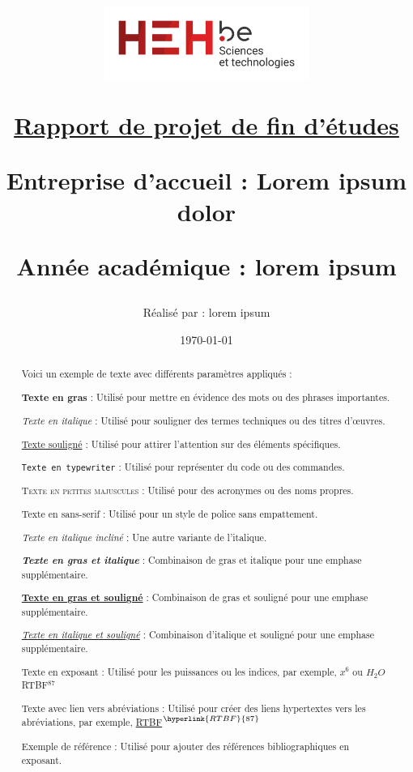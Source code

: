 \documentclass[a4paper, 12pt]{article}
\title{
    \begin{center}
        \includegraphics[width=0.5\textwidth]{img/logo_hehbe_tech.png}
    \end{center}
    \vspace{2cm}
    \begin{center}
        \underline{Rapport de projet de fin d'études}
    \end{center}
    \vspace{2cm}
    \begin{center}
        \fboxrule=0.3mm
        \fbox{
            \parbox{\textwidth}{
                \vspace{1cm}
                \centering
                \textbf{Lorem ipsum dolor sit amet, consectetur adipiscing elit. Vivamus lacinia odio vitae}
                \vspace{1cm}
            }
        }
    \end{center}
    \vspace{2cm}
    \begin{center}
        \small Entreprise d'accueil : Lorem ipsum dolor\\
    \end{center}
    \begin{center}
        \small Année académique : lorem ipsum
    \end{center}
    \author{Réalisé par : lorem ipsum}
    \date{\today}

}
\begin{document}
\maketitle
\newpage
\begin{abstract}
    Voici un exemple de texte avec différents paramètres appliqués :
    
    \textbf{Texte en gras} : Utilisé pour mettre en évidence des mots ou des phrases importantes.
    
    \textit{Texte en italique} : Utilisé pour souligner des termes techniques ou des titres d'œuvres.
    
    \underline{Texte souligné} : Utilisé pour attirer l'attention sur des éléments spécifiques.
    
    \texttt{Texte en typewriter} : Utilisé pour représenter du code ou des commandes.
    
    \textsc{Texte en petites majuscules} : Utilisé pour des acronymes ou des noms propres.
    
    \textsf{Texte en sans-serif} : Utilisé pour un style de police sans empattement.
    
    \textsl{Texte en italique incliné} : Une autre variante de l'italique.
    
    \textbf{\textit{Texte en gras et italique}} : Combinaison de gras et italique pour une emphase supplémentaire.
    
    \textbf{\underline{Texte en gras et souligné}} : Combinaison de gras et souligné pour une emphase supplémentaire.
    
    \textit{\underline{Texte en italique et souligné}} : Combinaison d'italique et souligné pour une emphase supplémentaire.
    
    Texte en exposant : Utilisé pour les puissances ou les indices, par exemple, $x^6$ ou $H_2O$ RTBF$^{87}$
    
    Texte avec lien vers abréviations : Utilisé pour créer des liens hypertextes vers les abréviations, par exemple, \hyperlink{RTBF}{RTBF}$^{\hyperlink{RTBF}{87}}$

    Exemple de référence\textsuperscript{\cite{ref1}} : Utilisé pour ajouter des références bibliographiques en exposant.
    
\end{abstract}

\newpage
\tableofcontents

\newpage
\newpage

\newpage
\newpage
\end{document}
